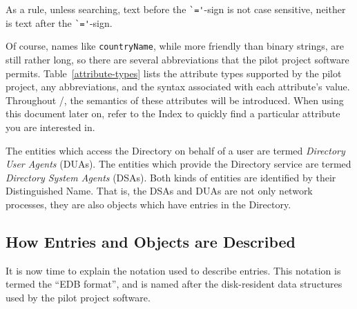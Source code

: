 As a rule,
unless searching,
text before the \verb"`='"-sign is not case sensitive,
neither is text after the \verb"`='"-sign.

Of course, names like \verb"countryName",
while more friendly than binary strings,
are still rather long,
so there are several abbreviations that the pilot project software permits.
Table~\ref{attribute-types} lists the attribute types supported by
the pilot project, any abbreviations, and the syntax associated with
each attribute's value.
Throughout \theguide/,
the semantics of these attributes will be introduced.
When using this document later on,
refer to the Index to quickly find a particular attribute you are interested
in.
\empty

The entities which access the Directory on behalf of a user
are termed {\em Directory User Agents\/} (DUAs).
The entities which provide the Directory service are termed
{\em Directory System Agents\/} (DSAs).
Both kinds of entities are identified by their Distinguished Name.
That is,
the DSAs and DUAs are not only network processes,
they are also objects which have entries in the Directory.

\subsection	{How Entries and Objects are Described}\label{edb:format}
It is now time to explain the notation used to describe entries.
This notation is termed the ``EDB format'',
and is named after the disk-resident data structures used by the
pilot project software.

